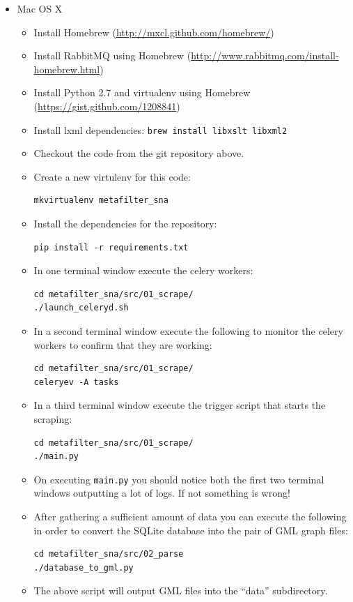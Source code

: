 \begin{itemize}
\item
  Mac OS X

  \begin{itemize}
  \item
    Install Homebrew (\url{http://mxcl.github.com/homebrew/})
  \item
    Install RabbitMQ using Homebrew
    (\url{http://www.rabbitmq.com/install-homebrew.html})
  \item
    Install Python 2.7 and virtualenv using Homebrew
    (\url{https://gist.github.com/1208841})
  \item
    Install lxml dependencies: \texttt{brew install libxslt libxml2}
  \item
    Checkout the code from the git repository above.
  \item
    Create a new virtulenv for this code:

\begin{verbatim}
mkvirtualenv metafilter_sna
\end{verbatim}
  \item
    Install the dependencies for the repository:

\begin{verbatim}
pip install -r requirements.txt
\end{verbatim}
  \item
    In one terminal window execute the celery workers:

\begin{verbatim}
cd metafilter_sna/src/01_scrape/
./launch_celeryd.sh
\end{verbatim}
  \item
    In a second terminal window execute the following to monitor the
    celery workers to confirm that they are working:

\begin{verbatim}
cd metafilter_sna/src/01_scrape/
celeryev -A tasks
\end{verbatim}
  \item
    In a third terminal window execute the trigger script that starts
    the scraping:

\begin{verbatim}
cd metafilter_sna/src/01_scrape/
./main.py
\end{verbatim}
  \item
    On executing \texttt{main.py} you should notice both the first two
    terminal windows outputting a lot of logs. If not something is
    wrong!
  \item
    After gathering a sufficient amount of data you can execute the
    following in order to convert the SQLite database into the pair of
    GML graph files:

\begin{verbatim}
cd metafilter_sna/src/02_parse
./database_to_gml.py
\end{verbatim}
  \item
    The above script will output GML files into the ``data''
    subdirectory.
  \end{itemize}
\end{itemize}

